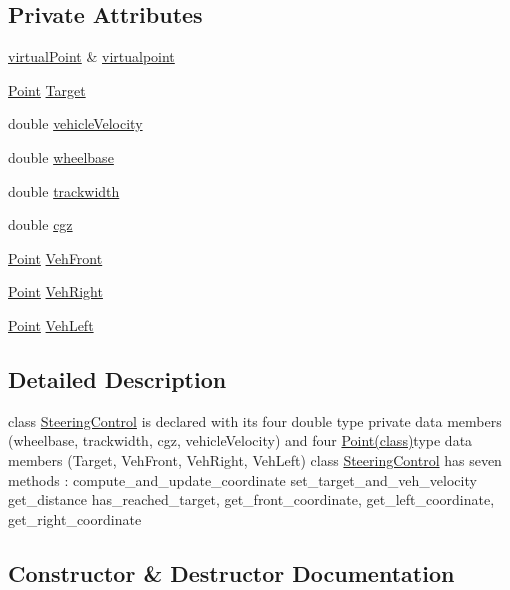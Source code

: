 \subsection*{Private Attributes}
\begin{DoxyCompactItemize}
\item 
\hyperlink{classvirtualPoint}{virtual\+Point} \& \hyperlink{classSteeringControl_ac3008c88d68138c338a4bd3ee32e46bd}{virtualpoint}
\item 
\hyperlink{classPoint}{Point} \hyperlink{classSteeringControl_ae181dcc9db1d96ddd96ad2edcabed5b0}{Target}
\item 
double \hyperlink{classSteeringControl_aea9c0f68cdd1a1bee63712460874e54d}{vehicle\+Velocity}
\item 
double \hyperlink{classSteeringControl_a7236de7b5f030e67047cdeaea3dbabb4}{wheelbase}
\item 
double \hyperlink{classSteeringControl_a46bd4d409f6f74ecbc8dbfd44bf46b33}{trackwidth}
\item 
double \hyperlink{classSteeringControl_af9a3eafcb4395ff4bc6cc504531e8608}{cgz}
\item 
\hyperlink{classPoint}{Point} \hyperlink{classSteeringControl_a460971214c3cf817819dc261e1a48828}{Veh\+Front}
\item 
\hyperlink{classPoint}{Point} \hyperlink{classSteeringControl_a991991a5e295b9c729749c709b84f3b2}{Veh\+Right}
\item 
\hyperlink{classPoint}{Point} \hyperlink{classSteeringControl_af444dd9970b9e9872d37c601a212d78a}{Veh\+Left}
\end{DoxyCompactItemize}


\subsection{Detailed Description}
class \hyperlink{classSteeringControl}{Steering\+Control} is declared with its four double type private data members (wheelbase, trackwidth, cgz, vehicle\+Velocity) and four \hyperlink{classPoint}{Point(class)}type data members (Target, Veh\+Front, Veh\+Right, Veh\+Left) class \hyperlink{classSteeringControl}{Steering\+Control} has seven methods \+: compute\+\_\+and\+\_\+update\+\_\+coordinate set\+\_\+target\+\_\+and\+\_\+veh\+\_\+velocity get\+\_\+distance has\+\_\+reached\+\_\+target, get\+\_\+front\+\_\+coordinate, get\+\_\+left\+\_\+coordinate, get\+\_\+right\+\_\+coordinate 

\subsection{Constructor \& Destructor Documentation}
